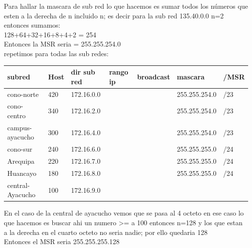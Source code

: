 \begin{landscape}
Para hallar la mascara de sub red lo que hacemos es sumar todos los n\'umeros que esten a la derecha de n incluido n; es decir para la sub red 135.40.0.0 n=2
entonces sumamos: \\
128+64+32+16+8+4+2 = 254\\
Entonces la MSR seria = 255.255.254.0\\
repetimos para todas las sub redes:
\begin{table}[htbp]
\begin{tabular}{|l|l|l|l|l|l|l|}
\hline
\rowcolor[HTML]{32CB00} 
\textbf{subred}  & Host & \textbf{dir sub red} & \textbf{rango ip} & \textbf{broadcast} & \textbf{mascara} & \textbf{/MSR} \\ \hline
cono-norte       & 420  & 172.16.0.0           &                   &                    & 255.255.254.0    & /23           \\ \hline
cono-centro      & 340  & 172.16.2.0           &                   &                    & 255.255.254.0    & /23           \\ \hline
campus-ayacucho  & 300  & 172.16.4.0           &                   &                    & 255.255.254.0    & /23           \\ \hline
cono-sur         & 240  & 172.16.6.0           &                   &                    & 255.255.255.0    & /24           \\ \hline
Arequipa         & 220  & 172.16.7.0           &                   &                    & 255.255.255.0    & /24           \\ \hline
Huancayo         & 180  & 172.16.8.0           &                   &                    & 255.255.255.0    & /24           \\ \hline
central-Ayacucho & 100  & 172.16.9.0           &                   &                    &                  &               \\ \hline
\end{tabular}
\end{table}

En el caso de la central de ayacucho vemos que se pasa al 4 octeto en ese caso lo que hacemos es buscar ahi un numero >= a 100 entonces n=128 y los que estan a la derecha en el cuarto octeto no seria nadie; por ello quedaria 128\\
Entonces el MSR seria 255.255.255.128\\


\end{landscape}
